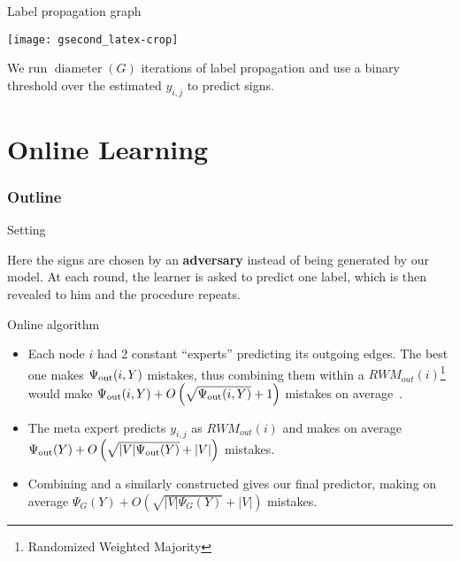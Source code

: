 \documentclass[10pt,svgnames,ignorenonframetext,final]{beamer}
\providecommand{\largelist}{%
  \setlength{\itemsep}{8pt}\setlength{\parskip}{3pt}}
\begin{document}
\begin{frame}{Label propagation graph}
  \begin{center}
  \vspace{-4mm}
    \texttt{[image: gsecond\_latex-crop]}
  \vspace{-4mm}
  \end{center}
  We run $\operatorname{diameter}(G)$ iterations of label propagation and use a binary threshold over the estimated $y_{i,j}$ to predict signs.
\end{frame}

\section{Online Learning}\label{online-learning}
  \begin{frame} \frametitle{Outline} \tableofcontents[currentsection] \end{frame}

\begin{frame}{Setting}

Here the signs are chosen by an \textbf{adversary} instead of being generated by
our model. At each round, the learner is asked to predict one label,
which is then revealed to him and the procedure repeats.

\end{frame}

\begin{frame}{Online algorithm}

  \begin{itemize}[<+->]
    \largelist
    \item 
Each node $i$ had 2 constant \enquote{experts} predicting its outgoing edges. 
The best one makes \(\Psi_{\mathrm{out}}(i, Y)\) mistakes, thus combining them within a
\(RWM_{out}(i)\)\footnote{Randomized Weighted Majority} would make 
$\Psi_{\mathrm{out}}(i,Y) + O\left(\sqrt{\Psi_{\mathrm{out}}(i,Y)}+ 1\right)$ mistakes on average~\autocite{acg02}.

    \item 
The meta expert  predicts \(y_{i,j}\) as \(RWM_{out}(i)\) and makes on average
$\Psi_{\mathrm{out}}(Y) + O\left(\sqrt{|V|\Psi_{\mathrm{out}}(Y)} + |V|\right)$ mistakes.

    \item 
    Combining  and a similarly constructed  gives our final
    predictor, making on average $\Psi_G(Y) + O\left(\sqrt{|V|\Psi_G(Y)} + |V|\right)$ mistakes.

\end{itemize}

\end{frame}
\end{document}

